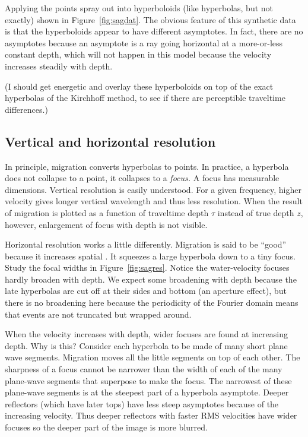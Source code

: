 Applying %
the points spray out into hyperboloids (like hyperbolas, but not exactly)
shown in Figure~\ref{fig:sagdat}.
The obvious feature of this synthetic data is that the hyperboloids
appear to have different asymptotes.
In fact, there are no asymptotes because an asymptote
is a ray going horizontal at a more-or-less constant depth,
which will not happen in this model
because the velocity increases steadily with depth.
\par
(I should get energetic and overlay these hyperboloids
on top of the exact hyperbolas of the Kirchhoff method,
to see if there are perceptible traveltime differences.)

\subsection{Vertical and horizontal resolution}
In principle, migration converts hyperbolas to points.
In practice, a hyperbola does not collapse to a point,
it collapses to a 
{\em  focus.}
A focus has measurable dimensions.
Vertical resolution is easily understood.
For a given frequency, higher velocity gives longer vertical wavelength
and thus less resolution.
When the result of migration is plotted as a function of
traveltime depth $\tau$ instead of true depth $z$, however,
enlargement of focus with depth is not visible.

\par
Horizontal resolution works a little differently.
Migration is said to be ``good'' because it increases spatial .
It squeezes a large hyperbola down to a tiny focus.
Study the focal widths in Figure~\ref{fig:sagres}. %
Notice the water-velocity focuses hardly broaden with depth.
We expect some broadening with depth because the late
hyperbolas are cut off at their sides and bottom
(an aperture effect),
but there is no broadening here
because the periodicity of the Fourier domain
means that events are not truncated but wrapped around.
%
\par
When the velocity increases with depth,
wider focuses are found at increasing depth.
Why is this?
Consider each hyperbola to be made of many short plane wave segments.
Migration moves all the little segments on top of each other.
The sharpness of a focus cannot be narrower
than the width of each of the many plane-wave segments
that superpose to make the focus.
The narrowest of these plane-wave segments
is at the steepest part of a hyperbola asymptote.
Deeper reflectors (which have later tops)
have less steep asymptotes because
of the increasing velocity.
Thus deeper reflectors with faster RMS velocities have wider focuses
so the deeper part of the image is more blurred.


